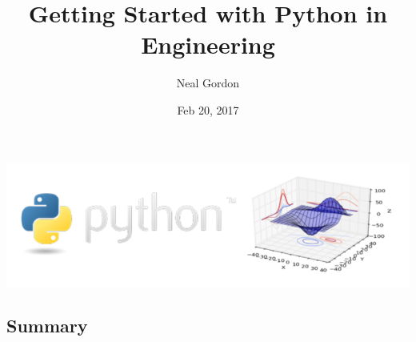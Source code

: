 \documentclass[%
oneside,                 %
final,                   %
10pt]{article}
\begin{document}






\title{{\color{seccolor} Getting Started with Python in Engineering}}


\author{Neal Gordon}


\date{Feb 20, 2017}
\maketitle

\centerline{\includegraphics[width=0.9\linewidth]{fig/pythonengineering.png}}



\subsection{Summary}
\end{document}
